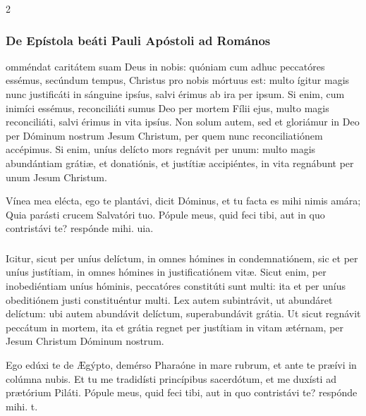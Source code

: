 \documentclass[9pt,twoside]{extarticle}
\begin{document}
\begin{multicols}{2}
\subsubsection*{\center De Epístola beáti Pauli Apóstoli ad Romános}
\begin{center}\end{center}
omméndat caritátem suam Deus in nobis: quóniam cum adhuc peccatóres essémus, secúndum tempus, Christus pro nobis mórtuus est: multo ígitur magis nunc justificáti in sánguine ipsíus, salvi érimus ab ira per ipsum. Si enim, cum inimíci essémus, reconciliáti sumus Deo per mortem Fílii ejus, multo magis reconciliáti, salvi érimus in vita ipsíus. Non solum autem, sed et gloriámur in Deo per Dóminum nostrum Jesum Christum, per quem nunc reconciliatiónem accépimus. Si enim, uníus delícto mors regnávit per unum: multo magis abundántiam grátiæ, et donatiónis, et justítiæ accipiéntes, in vita regnábunt per unum Jesum Christum.

\begin{tightlist}{}
\item {} Vínea mea elécta, ego te plantávi, dicit Dóminus, et tu facta es mihi nimis amára; \textred{*} Quia parásti crucem Salvatóri tuo.  Pópule meus, quid feci tibi, aut in quo contristávi te? respónde mihi. uia.
\end{tightlist}

\subsubsection*{\center{}}
\lettrine{I}gitur, sicut per uníus delíctum, in omnes hómines in condemnatiónem, sic et per uníus justítiam, in omnes hómines in justificatiónem vitæ. Sicut enim, per inobediéntiam uníus hóminis, peccatóres constitúti sunt multi: ita et per uníus obeditiónem justi constituéntur multi. Lex autem subintrávit, ut abundáret delíctum: ubi autem abundávit delíctum, superabundávit grátia. Ut sicut regnávit peccátum in mortem, ita et grátia regnet per justítiam in vitam ætérnam, per Jesum Christum Dóminum nostrum.

\begin{tightlist}{}
\item {} Ego edúxi te de Ægýpto, demérso Pharaóne in mare rubrum, et ante te præívi in colúmna nubis. \textred{*} Et tu me tradidísti princípibus sacerdótum, et me duxísti ad prætórium Piláti.  Pópule meus, quid feci tibi, aut in quo contristávi te? respónde mihi. t.
\end{tightlist}


\end{multicols}
\end{document}
